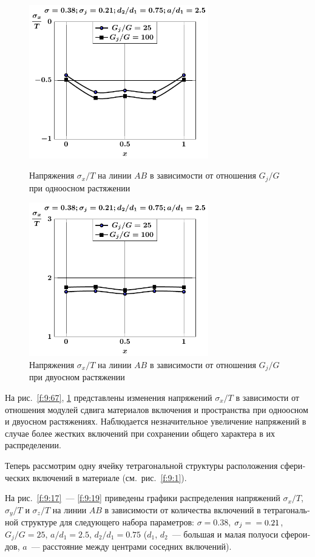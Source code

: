 \begin{russian}
\begin{figure}[h!]
\centering\footnotesize
\parbox[b]{7.5cm}{\centering\includegraphics[width=7.8cm]{inc4-g-a25-d75-t1-sig_x.pdf}
\caption{Напряжения $\sigma_x/T$ на линии $AB$ в зависимости от отношения $G_j/G$ при одноосном растяжении
\label{f:9:67}}}\hfil\hfil
\parbox[b]{7.5cm}{\centering\includegraphics[width=7.8cm]{inc4-g-a25-d75-t2-sig_x.pdf}
\caption{Напряжения $\sigma_x/T$ на линии $AB$ в зависимости от отношения $G_j/G$ при двуосном растяжении
\label{f:9:68}}}
\end{figure}

На рис.~\ref{f:9:67}, \ref{f:9:68} представлены изменения напряжений $\sigma_x/T$ в зависимости от отношения модулей сдвига материалов включения и пространства при одноосном и двуосном растяжениях. Наблюдается незначительное увеличение напряжений в случае более жестких включений при сохранении общего характера в их распределении.

Теперь рассмотрим одну ячейку тетрагональной структуры расположения сферических включений в материале (см.~рис.~\ref{f:9:1}).

На рис.~\ref{f:9:17}~--- \ref{f:9:19} приведены графики распределения напряжений $\sigma_x/T$, $\sigma_y/T$ и $\sigma_z/T$ на линии $AB$ в зависимости от количества включений в тетрагональной структуре для следующего набора параметров: $\sigma=0.38$, $\sigma_j=\\=0.21$, $G_j/G=25$, $a/d_1=2.5$, $d_2/d_1=0.75$ ($d_1$, $d_2$~--- большая и малая полуоси сфероидов, $a$~--- расстояние между центрами соседних включений).


\end{russian}
